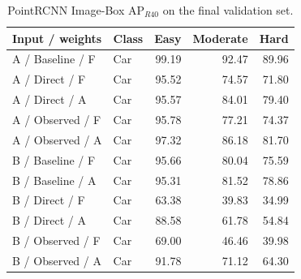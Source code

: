 \begin{table}[!t]\centering
\begin{tabular}{llrrr}\toprule
Input / weights & Class & Easy & Moderate & Hard\\\midrule
A / Baseline / F & Car & 99.19 & 92.47 & 89.96 \\
A / Direct / F & Car & 95.52 & 74.57 & 71.80 \\
A / Direct / A & Car & 95.57 & 84.01 & 79.40 \\
A / Observed / F & Car & 95.78 & 77.21 & 74.37 \\
A / Observed / A & Car & 97.32 & 86.18 & 81.70 \\
B / Baseline / F & Car & 95.66 & 80.04 & 75.59 \\
B / Baseline / A & Car & 95.31 & 81.52 & 78.86 \\
B / Direct / F & Car & 63.38 & 39.83 & 34.99 \\
B / Direct / A & Car & 88.58 & 61.78 & 54.84 \\
B / Observed / F & Car & 69.00 & 46.46 & 39.98 \\
B / Observed / A & Car & 91.78 & 71.12 & 64.30 \\
\bottomrule\end{tabular}
\caption{PointRCNN Image-Box AP$_{R40}$ on the final validation set.}\label{tab:pr-bbox-full}
\end{table}

